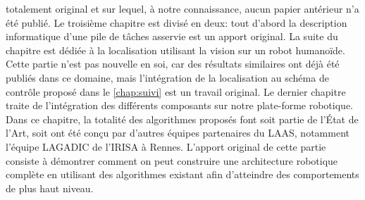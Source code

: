 totalement original et sur lequel, à notre connaissance, aucun papier
antérieur n'a été publié. Le troisième chapitre est divisé en deux:
tout d'abord la description informatique d'une pile de tâches asservie
est un apport original. La suite du chapitre est dédiée à la
localisation utilisant la vision sur un robot humanoïde. Cette partie
n'est pas nouvelle en soi, car des résultats similaires ont déjà été
publiés dans ce domaine, mais l'intégration de la localisation au
schéma de contrôle proposé dans le \autoref{chap:suivi} est un travail
original. Le dernier chapitre traite de l'intégration des différents
composants sur notre plate-forme robotique. Dans ce chapitre, la
totalité des algorithmes proposés font soit partie de l'État de l'Art,
soit ont été conçu par d'autres équipes partenaires du LAAS, notamment
l'équipe \mbox{LAGADIC} de l'IRISA à Rennes. L'apport original de cette
partie consiste à démontrer comment on peut construire une
architecture robotique complète en utilisant des algorithmes existant
afin d'atteindre des comportements de plus haut niveau.
